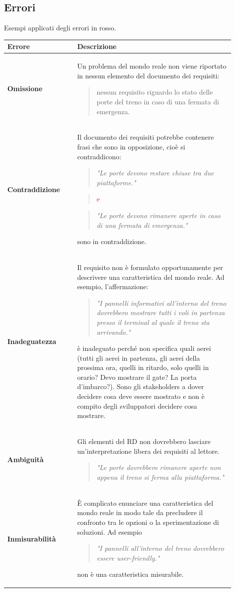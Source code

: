 \subsection{Errori}
Esempi applicati degli errori in rosso.
\begin{longtable}{|m{0.29\linewidth}|m{0.63\linewidth}|}
	\hline
	\textbf{Errore} & \textbf{Descrizione}\\
	\hline
	\textbf{Omissione} & Un problema del mondo reale non viene riportato in nessun elemento del documento dei requisiti:
	\begin{verse}
		nessun requisito riguardo lo stato delle porte del treno in caso di una fermata di emergenza.
	\end{verse}\\
	\hline
	\textbf{Contraddizione} & Il documento dei requisiti potrebbe contenere frasi che sono in opposizione, cioè si contraddicono:  \begin{verse}
		\textit{"Le porte devono restare chiuse tra due piattaforme."}
	\end{verse}
	\begin{verse}
		\textcolor{red}{ e }
	\end{verse}
	\begin{verse}
		\textit{"Le porte devono rimanere aperte in caso di una fermata di emergenza."}
	\end{verse}
	sono in contraddizione.\\
	\hline
	\textbf{Inadeguatezza} & Il requisito non è formulato opportunamente per descrivere una caratteristica del mondo reale. Ad esempio, l'affermazione:
	\begin{verse}
		\textit{"I pannelli informativi all'interno del treno dovrebbero mostrare tutti i voli in partenza presso il terminal al quale il treno sta arrivando."}
	\end{verse}
	è inadeguato perché non specifica quali aerei (tutti gli aerei in partenza, gli aerei della prossima ora, quelli in ritardo, solo quelli in orario? Devo mostrare il gate? La porta d'imbarco?). Sono gli stakeholders a dover decidere cosa deve essere mostrato e non è compito degli sviluppatori decidere cosa mostrare.\\
	\hline
	\textbf{Ambiguità} & Gli elementi del RD non dovrebbero lasciare un'interpretazione libera dei requisiti al lettore.
	\begin{verse}
		\textit{"Le porte dovrebbero rimanere aperte non appena il treno si ferma alla piattaforma."}
	\end{verse}\\
	\hline
	\textbf{Inmisurabilità} & È complicato enunciare una caratteristica del mondo reale in modo tale da precludere il confronto tra le opzioni o la sperimentazione di soluzioni. Ad esempio
	\begin{verse}
		\textit{"I pannelli all'interno del treno dovrebbero essere user-friendly."}
	\end{verse}
	non è una caratteristica misurabile.
	\\
	\hline
\end{longtable}
